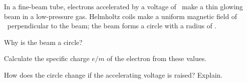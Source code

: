 In a fine-beam tube, electrons accelerated by a voltage of \UO\ make a thin glowing beam in a low-pressure gas. Helmholtz coils make a uniform magnetic field of \BO\ perpendicular to the beam; the beam forms a circle with a radius of \rO.

\begin{abcliste}
\abc Why is the beam a circle?

\abc Calculate the specific charge $e/m$ of the electron from these values.

\abc How does the circle change if the accelerating voltage is raised? Explain.
\end{abcliste}
